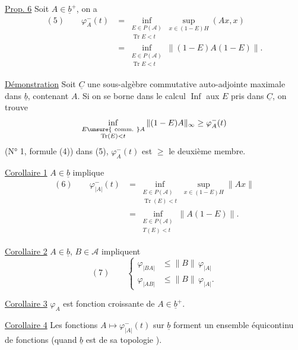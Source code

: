 
\uline{Prop. 6} Soit $A\in\underline b^+$, on a
\[
\begin{aligned}
(5)\qquad \varphi_A^-(t)
 &=\inf_{\substack{E\in P(\mathcal A)\\ \operatorname{Tr}E<t}}
       \sup_{x\in(1-E)H}(Ax,x)\\
 &=\inf_{\substack{E\in P(\mathcal A)\\ \operatorname{Tr}E<t}}
       \|(1-E)A(1-E)\|.
\end{aligned}
\]

\uline{Démonstration} Soit $\underline C$  une sous-algèbre commutative auto-adjointe maximale dans $\underline b$, contenant $A$. Si on se borne dans le calcul  $\operatorname{Inf}$ aux $E$ pris dans $\underline C$, on trouve
\[
\inf_{\substack{E\unsure{\mathrm{\ comm.\ }}A\\ \operatorname{Tr}(E)<t}}
\|(1-E)A\|_\infty\geq\varphi_A^-(t)
\]
\margin{$\downarrow$}
(N° 1, formule (4))  dans (5), $\varphi_A^-(t)$ est $\geq$ le deuxième membre.

\uline{Corollaire 1} $A\in\underline b$ implique
\[
\begin{aligned}
(6)\qquad \varphi_{|A|}^-(t)
 &=\inf_{\substack{E\in P(\mathcal A)\\ \operatorname{Tr}(E)<t}}
       \sup_{x\in(1-E)H}\|Ax\|\\
 &=\inf_{\substack{E\in P(\mathcal A)\\ T(E)<t}}\|A(1-E)\|.
\end{aligned}
\]

\uline{Corollaire 2} $A\in\underline b$, $B\in\mathcal A$ impliquent
\[
(7)\qquad
\left\{\begin{aligned}
\varphi_{|BA|}&\leq\|B\|\,\varphi_{|A|}\\
\varphi_{|AB|}&\leq\|B\|\,\varphi_{|A|}.
\end{aligned}\right.
\]

\uline{Corollaire 3} $\varphi_A$ est fonction croissante de $A\in\underline b^+$.

\uline{Corollaire 4} Les fonctions $A\longmapsto\varphi_{|A|}^-(t)$ sur $\underline b$ forment un ensemble équicontinu de fonctions (quand $\underline b$ est  de sa topologie ).
\margin{$\Big|$}

